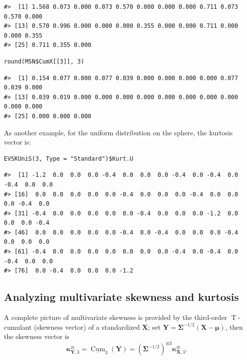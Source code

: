 \begin{verbatim}
#>  [1] 1.568 0.073 0.000 0.073 0.570 0.000 0.000 0.000 0.711 0.073 0.570 0.000
#> [13] 0.570 0.996 0.000 0.000 0.000 0.355 0.000 0.000 0.711 0.000 0.000 0.355
#> [25] 0.711 0.355 0.000
\end{verbatim}

\begin{verbatim}
round(MSN$CumX[[3]], 3)
\end{verbatim}

\begin{verbatim}
#>  [1] 0.154 0.077 0.000 0.077 0.039 0.000 0.000 0.000 0.000 0.077 0.039 0.000
#> [13] 0.039 0.019 0.000 0.000 0.000 0.000 0.000 0.000 0.000 0.000 0.000 0.000
#> [25] 0.000 0.000 0.000
\end{verbatim}

As another example, for the uniform distribution on the sphere, the kurtosis vector is:

\begin{verbatim}
EVSKUniS(3, Type = "Standard")$Kurt.U
\end{verbatim}

\begin{verbatim}
#>  [1] -1.2  0.0  0.0  0.0 -0.4  0.0  0.0  0.0 -0.4  0.0 -0.4  0.0 -0.4  0.0  0.0
#> [16]  0.0  0.0  0.0  0.0  0.0 -0.4  0.0  0.0  0.0 -0.4  0.0  0.0  0.0 -0.4  0.0
#> [31] -0.4  0.0  0.0  0.0  0.0  0.0 -0.4  0.0  0.0  0.0 -1.2  0.0  0.0  0.0 -0.4
#> [46]  0.0  0.0  0.0  0.0  0.0 -0.4  0.0 -0.4  0.0  0.0  0.0 -0.4  0.0  0.0  0.0
#> [61] -0.4  0.0  0.0  0.0  0.0  0.0  0.0  0.0 -0.4  0.0 -0.4  0.0 -0.4  0.0  0.0
#> [76]  0.0 -0.4  0.0  0.0  0.0 -1.2
\end{verbatim}

\hypertarget{analyzing-multivariate-skewness-and-kurtosis}{%
\subsection{Analyzing multivariate skewness and kurtosis}\label{analyzing-multivariate-skewness-and-kurtosis}}

A complete picture of multivariate skewness is provided by the third-order \(\operatorname{T}\)-cumulant (skewness vector) of a standardized \(\mathbf{X}\); set \(\mathbf{Y}=\boldsymbol{\Sigma}^{-1/2}(\mathbf{X}-\boldsymbol{\mu})\), then the skewness vector is
\begin{equation}\label{SkewV}
\boldsymbol{\kappa}_{\mathbf{Y},3}^\otimes= \underline{\operatorname{Cum}}_3 \left( \mathbf{Y}\right)=\left(\mathbf{\Sigma}^{-1/2}\right)^{\otimes 3} \boldsymbol{\kappa}_{\mathbf{X},3}^\otimes.
\end{equation}

